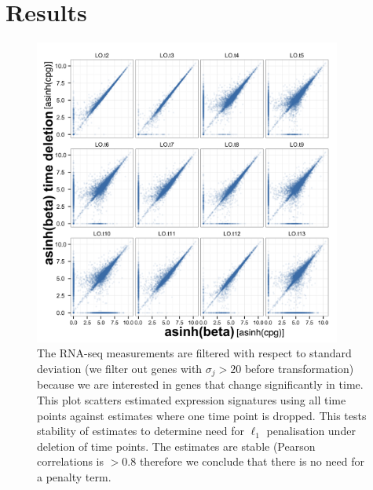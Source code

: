\section{Results}
\label{sec:results-mcf10a}

\begin{figure}
  \centering
  \includegraphics[width=0.9\textwidth]{pics/no-pen-data.png}
  \caption{The RNA-seq measurements are filtered with respect to standard deviation (we filter out genes with $\sigma_j > 20$ before transformation) because we are interested in genes that change significantly in time. This plot scatters estimated expression signatures using all time points against estimates where one time point is dropped. This tests stability of estimates to determine need for $\ell_1$ penalisation under deletion of time points. The estimates are stable (Pearson correlations is $>0.8$ therefore we conclude that there is no need for a penalty term.}
  \label{fig:data-pen}
\end{figure}

